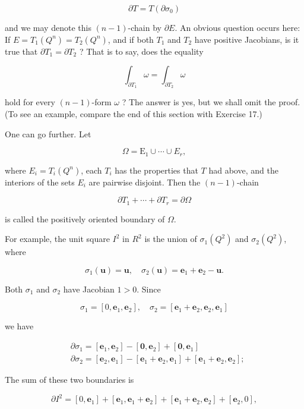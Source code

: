 \documentclass[10pt]{article}
\begin{document}
$$
\partial T=T\left(\partial \sigma_{0}\right)
$$

and we may denote this $(n-1)$-chain by $\partial E$. An obvious question occurs here: If $E=T_{1}\left(Q^{n}\right)=T_{2}\left(Q^{n}\right)$, and if both $T_{1}$ and $T_{2}$ have positive Jacobians, is it true that $\partial T_{1}=\partial T_{2}$ ? That is to say, does the equality

$$
\int_{\partial T_{1}} \omega=\int_{\partial T_{2}} \omega
$$

hold for every $(n-1)$-form $\omega$ ? The answer is yes, but we shall omit the proof. (To see an example, compare the end of this section with Exercise 17.)

One can go further. Let

$$
\Omega=\mathrm{E}_{1} \cup \cdots \cup E_{r},
$$

where $E_{i}=T_{i}\left(Q^{n}\right)$, each $T_{i}$ has the properties that $T$ had above, and the interiors of the sets $E_{i}$ are pairwise disjoint. Then the $(n-1)$-chain

$$
\partial T_{1}+\cdots+\partial T_{r}=\partial \Omega
$$

is called the positively oriented boundary of $\Omega$.

For example, the unit square $I^{2}$ in $R^{2}$ is the union of $\sigma_{1}\left(Q^{2}\right)$ and $\sigma_{2}\left(Q^{2}\right)$, where

$$
\sigma_{1}(\mathbf{u})=\mathbf{u}, \quad \sigma_{2}(\mathbf{u})=\mathbf{e}_{1}+\mathbf{e}_{2}-\mathbf{u} .
$$

Both $\sigma_{1}$ and $\sigma_{2}$ have Jacobian $1>0$. Since

$$
\sigma_{1}=\left[0, \mathbf{e}_{1}, \mathbf{e}_{2}\right], \quad \sigma_{2}=\left[\mathbf{e}_{1}+\mathbf{e}_{2}, \mathbf{e}_{2}, \mathbf{e}_{1}\right]
$$

we have

$$
\begin{aligned}
& \partial \sigma_{1}=\left[\mathbf{e}_{1}, \mathbf{e}_{2}\right]-\left[\mathbf{0}, \mathbf{e}_{2}\right]+\left[\mathbf{0}, \mathbf{e}_{1}\right] \\
& \partial \sigma_{2}=\left[\mathbf{e}_{2}, \mathbf{e}_{1}\right]-\left[\mathbf{e}_{1}+\mathbf{e}_{2}, \mathbf{e}_{1}\right]+\left[\mathbf{e}_{1}+\mathbf{e}_{2}, \mathbf{e}_{2}\right] ;
\end{aligned}
$$

The sum of these two boundaries is

$$
\partial I^{2}=\left[0, \mathbf{e}_{1}\right]+\left[\mathbf{e}_{1}, \mathbf{e}_{1}+\mathbf{e}_{2}\right]+\left[\mathbf{e}_{1}+\mathbf{e}_{2}, \mathbf{e}_{2}\right]+\left[\mathbf{e}_{2}, 0\right],
$$
\end{document}

